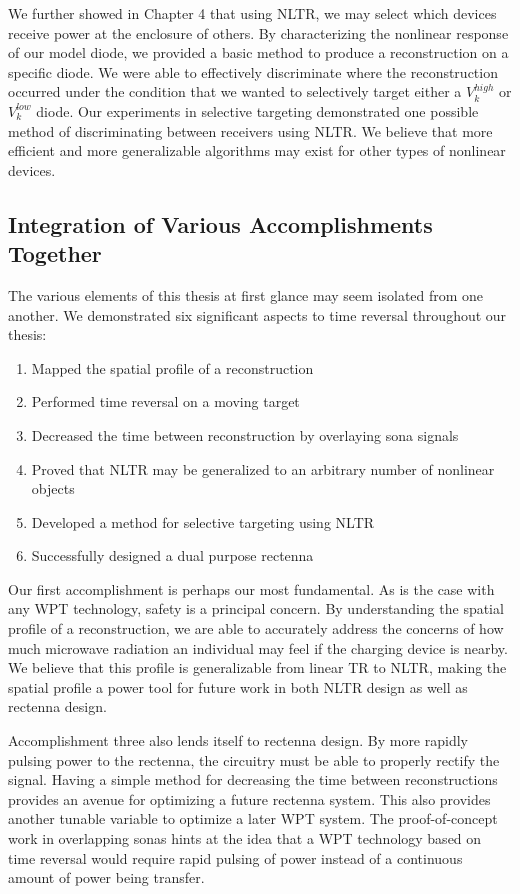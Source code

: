 We further showed in Chapter 4 that using NLTR, we may select which devices receive power at the enclosure of others. By characterizing the nonlinear response of our model diode, we provided a basic method to produce a reconstruction on a specific diode. We were able to effectively discriminate where the reconstruction occurred under the condition that we wanted to selectively target either a $V_{k}^{high}$ or $V_{k}^{low}$ diode. Our experiments in selective targeting demonstrated one possible method of discriminating between receivers using NLTR. We believe that more efficient and more generalizable algorithms may exist for other types of nonlinear devices. 

\subsection{Integration of Various Accomplishments Together}

The various elements of this thesis at first glance may seem isolated from one another. We demonstrated six significant aspects to time reversal throughout our thesis:

\begin{enumerate}
\item Mapped the spatial profile of a reconstruction
\item Performed time reversal on a moving target
\item Decreased the time between reconstruction by overlaying sona signals
\item Proved that NLTR may be generalized to an arbitrary number of nonlinear objects
\item Developed a method for selective targeting using NLTR
\item Successfully designed a dual purpose rectenna
\end{enumerate}

Our first accomplishment is perhaps our most fundamental. As is the case with any WPT technology, safety is a principal concern. By understanding the spatial profile of a reconstruction, we are able to accurately address the concerns of how much microwave radiation an individual may feel if the charging device is nearby. We believe that this profile is generalizable from linear TR to NLTR, making the spatial profile a power tool for future work in both NLTR design as well as rectenna design.

Accomplishment three also lends itself to rectenna design. By more rapidly pulsing power to the rectenna, the circuitry must be able to properly rectify the signal. Having a simple method for decreasing the time between reconstructions provides an avenue for optimizing a future rectenna system. This also provides another tunable variable to optimize a later WPT system. The proof-of-concept work in overlapping sonas hints at the idea that a WPT technology based on time reversal would require rapid pulsing of power instead of a continuous amount of power being transfer.


